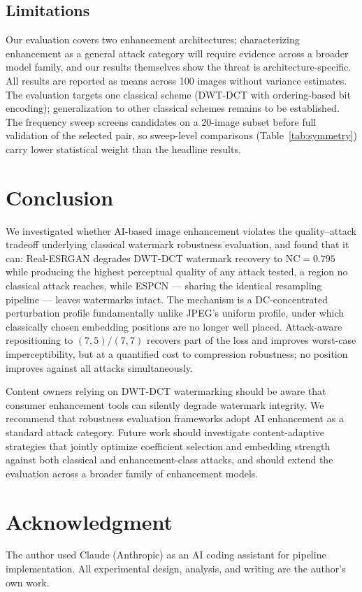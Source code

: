 \documentclass[conference]{IEEEtran}
\begin{document}
\subsection{Limitations}
Our evaluation covers two enhancement architectures; characterizing
enhancement as a general attack category will require evidence across
a broader model family, and our results themselves show the threat is
architecture-specific. All results are reported as means across 100
images without variance estimates. The evaluation targets one
classical scheme (DWT-DCT with ordering-based bit encoding);
generalization to other classical schemes remains to be established.
The frequency sweep screens candidates on a 20-image subset before
full validation of the selected pair, so sweep-level comparisons
(Table~\ref{tab:symmetry}) carry lower statistical weight than the
headline results.

\section{Conclusion}
\label{sec:conclusion}

We investigated whether AI-based image enhancement violates the
quality--attack tradeoff underlying classical watermark robustness
evaluation, and found that it can: Real-ESRGAN degrades DWT-DCT
watermark recovery to $\mathrm{NC}=0.795$ while producing the highest
perceptual quality of any attack tested, a region no classical attack
reaches, while ESPCN --- sharing the identical resampling pipeline ---
leaves watermarks intact. The mechanism is a DC-concentrated
perturbation profile fundamentally unlike JPEG's uniform profile,
under which classically chosen embedding positions are no longer well
placed. Attack-aware repositioning to $(7,5)/(7,7)$ recovers part of
the loss and improves worst-case imperceptibility, but at a quantified
cost to compression robustness; no position improves against all
attacks simultaneously.

Content owners relying on DWT-DCT watermarking should be aware that
consumer enhancement tools can silently degrade watermark integrity.
We recommend that robustness evaluation frameworks adopt AI
enhancement as a standard attack category. Future work should
investigate content-adaptive strategies that jointly optimize
coefficient selection and embedding strength against both classical
and enhancement-class attacks, and should extend the evaluation across
a broader family of enhancement models.

\section*{Acknowledgment}
The author used Claude (Anthropic) as an AI coding assistant for
pipeline implementation. All experimental design, analysis, and
writing are the author's own work.



\end{document}
